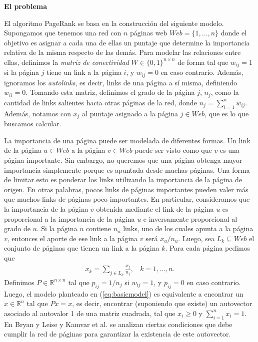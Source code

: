 \documentclass[11pt, a4paper]{article}
\begin{document}
\textbf{El problema}

El algoritmo PageRank se basa en la construcci\'on del siguiente modelo. Supongamos que tenemos una red con $n$ p\'aginas 
web $Web = \{1,\dots,n\}$ donde
el objetivo es asignar a cada una de ellas un puntaje que determine la importancia relativa de la misma respecto de las
dem\'as. Para modelar las relaciones entre ellas, definimos la \emph{matriz de conectividad} $W \in \{0,1\}^{n \times n}$ 
de forma tal que $w_{ij} = 1$ si la p\'agina $j$ tiene un link a la p\'agina $i$, y $w_{ij} = 0$ en caso contrario. 
Adem\'as, ignoramos los \emph{autolinks}, es decir, links de una p\'agina a s\'i misma, definiendo $w_{ii} = 0$. Tomando 
esta matriz, definimos el grado de la p\'agina $j$, $n_j$, como la cantidad de links salientes hacia otras p\'aginas 
de la red, donde $n_j = \sum_{i = 1}^n w_{ij}$. Adem\'as, notamos con $x_j$ al puntaje asignado a la p\'agina $j\in
Web$, que es lo que buscamos calcular.

La importancia de una p\'agina puede ser modelada de diferentes formas. Un link de la p\'agina $u \in
Web$ a la p\'agina $v \in Web$ puede ser visto como que $v$ es una p\'agina importante. Sin embargo, no queremos que una
p\'agina obtenga mayor importancia simplemente porque es apuntada desde muchas p\'aginas. 
Una forma de limitar esto es ponderar los links utilizando la importancia de la p\'agina de origen. En otras palabras,
pocos links de p\'aginas importantes pueden valer m\'as que muchos links de p\'aginas poco importantes. En particular,
consideramos que la importancia de la p\'agina $v$ obtenida mediante el link de la p\'agina $u$ es proporcional a la 
importancia de la p\'agina $u$ e inversamente proporcional al grado de $u$. Si la p\'agina $u$ contiene $n_u$ links,
uno de los cuales apunta a la p\'agina $v$, entonces el aporte de ese link a la p\'agina $v$ ser\'a $x_u/n_u$. Luego,
sea $L_k \subseteq Web$ el conjunto de p\'aginas que tienen un link a la p\'agina $k$. Para cada p\'agina pedimos que
\begin{eqnarray}
x_k = \sum_{j \in L_k} \frac{x_j}{n_j},~~~~k = 1,\dots,n. \label{eq:basicmodel}
\end{eqnarray}
Definimos $P \in  \mathbb{R}^{n \times n}$ tal que $p_{ij} = 1/n_j$ si $w_{ij} = 1$, y $p_{ij} = 0$ en caso contrario. Luego,
el modelo planteado en (\ref{eq:basicmodel}) es equivalente a encontrar un $x\in \mathbb{R}^n$ tal que $Px = x$, es
decir, encontrar (suponiendo que existe) un autovector asociado al autovalor 1 de una matriz cuadrada, tal que $x_i \ge
0$ y $\sum_{i = 1}^n x_i = 1$. En
Bryan y Leise \cite{Bryan2006} y Kamvar et al. \cite[Secci\'on 1]{Kamvar2003} se analizan ciertas condiciones que debe
cumplir la red de p\'aginas para garantizar la existencia de este autovector.
\end{document}
